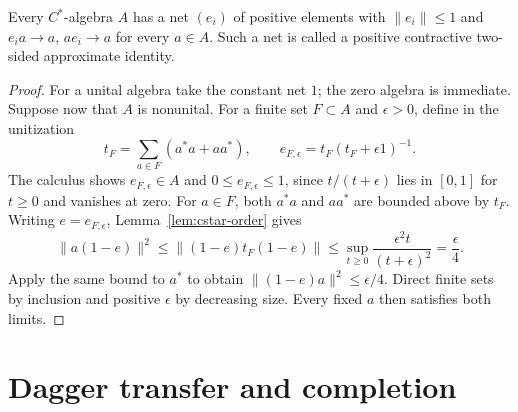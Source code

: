 \begin{lemma}
\label{lem:cstar-approximate}
Every $C^*$-algebra $A$ has a net $(e_i)$ of positive elements with
$\|e_i\|\leq1$ and $e_i a\to a$, $a e_i\to a$ for every $a\in A$.
Such a net is called a positive contractive two-sided approximate identity.
\end{lemma}

\begin{proof}
For a unital algebra take the constant net $1$; the zero algebra is
immediate.  Suppose now that $A$ is nonunital.  For a finite set
$F\subset A$ and $\epsilon>0$, define in the unitization
\[
 t_F=\sum_{a\in F}(a^*a+aa^*),\qquad
 e_{F,\epsilon}=t_F(t_F+\epsilon1)^{-1}.
\]
The calculus shows $e_{F,\epsilon}\in A$ and
$0\leq e_{F,\epsilon}\leq1$, since $t/(t+\epsilon)$ lies in $[0,1]$
for $t\geq0$ and vanishes at zero.
For $a\in F$, both $a^*a$ and $aa^*$ are bounded above by $t_F$.
Writing $e=e_{F,\epsilon}$, Lemma~\ref{lem:cstar-order} gives
\[
 \|a(1-e)\|^2\leq\|(1-e)t_F(1-e)\|
 \leq\sup_{t\geq0}\frac{\epsilon^2 t}{(t+\epsilon)^2}
 =\frac\epsilon4.
\]
Apply the same bound to $a^*$ to obtain $\|(1-e)a\|^2\leq\epsilon/4$.
Direct finite sets by inclusion and positive $\epsilon$ by decreasing size.
Every fixed $a$ then satisfies both limits.
\end{proof}


\section{Dagger transfer and completion}


